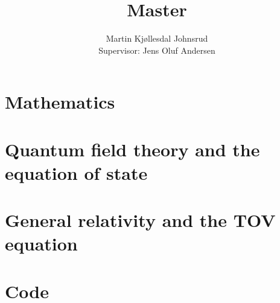 \documentclass{book}
\title{\huge{Master}}
\author{
    \large{Martin Kjøllesdal Johnsrud }\\
    \normalsize{Supervisor: Jens Oluf Andersen}
    }
\begin{document}
    \maketitle
    \listoftodos
    \clearpage
    \tableofcontents

    \setlength{\parindent}{0em}
    \setlength{\parskip}{0.8em}


    \chapter{Mathematics}
    \label{chapter: math }
    
    


    \chapter{Quantum field theory and the equation of state}
    

    \chapter{General relativity and the TOV equation}
    \label{chapter: GR}
    
    
    

    \appendix

    \chapter[Appendix A]{}
    

    
    \chapter{Code}
    


    \printbibliography
\end{document}

